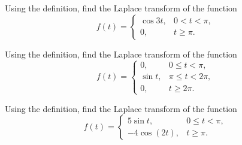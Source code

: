 \documentclass[12pt, a4paper]{article}
\begin{document}
\clearpage

\begin{problem}
	Using the definition, find the Laplace transform of the function
	\[
	f(t)=
	\begin{cases}
	\cos 3t, & 0<t<\pi,\\
	0, & t\ge \pi.
	\end{cases}
	\]
		
\end{problem}


\clearpage

\begin{problem}
	Using the definition, find the Laplace transform of the function
	\[
	f(t)=
	\begin{cases}
	0, & 0\le t<\pi,\\
	\sin t, & \pi\le t<2\pi,\\
	0, & t\ge 2\pi.
	\end{cases}
	\]
		
\end{problem}

\clearpage

\begin{problem}
	Using the definition, find the Laplace transform of the function
	\[
	f(t)=
	\begin{cases}
	5\sin t, & 0\le t<\pi,\\
	-4\cos(2t), & t\ge \pi.
	\end{cases}
	\]
		
\end{problem}





\EndPage
\end{document}
